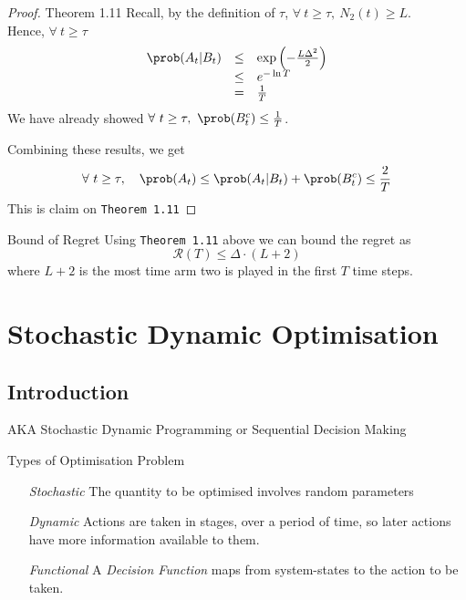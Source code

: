 \documentclass[11pt,a4paper]{article}
\begin{document}
\begin{proof}{Theorem 1.11}
    Recall, by the definition of $\tau$, $\forall\ t\geq\tau,\ N_2(t)\geq L$.\\
    Hence, $\forall\ t\geq\tau$
    \[\begin{array}{rcl}
      \prob(A_t|B_t)&\leq&\exp\left(-\frac{L\Delta^2}2\right)\\
      &\leq&e^{-\ln T}\\
      &=&\frac1T
    \end{array}\]
    We have already showed $\forall\ t\geq\tau,\ \prob(B_t^c)\leq\frac1T$.
    \par Combining these results, we get
    \[ \forall\ t\geq\tau,\quad\prob(A_t)\leq\prob(A_t|B_t)+\prob(B_t^c)\leq\frac2T \]
    This is claim on \texttt{Theorem 1.11} \proved
  \end{proof}

  \begin{proposition}{Bound of Regret}
    Using \texttt{Theorem 1.11}  above we can bound the regret as
    \[ \mathcal{R}(T)\leq\Delta\cdot(L+2) \]
    where $L+2$ is the most time arm two is played in the first $T$ time steps.
  \end{proposition}

\section{Stochastic Dynamic Optimisation}

\subsection{Introduction}

  \begin{remark}{AKA}
    Stochastic Dynamic Programming or Sequential Decision Making
  \end{remark}

  \begin{definition}{Types of Optimisation Problem}
    \begin{itemize}
      \item[\textit{Stochastic}] The quantity to be optimised involves random parameters
      \item[\textit{Dynamic}] Actions are taken in stages, over a period of time, so later actions have more information available to them.
      \item[\textit{Functional}] A \textit{Decision Function} maps from system-states to the action to be taken.
    \end{itemize}
  \end{definition}
\end{document}
